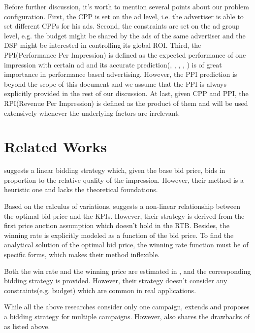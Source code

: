 \documentclass{article}
\begin{document}
Before further discussion, it's worth to mention several points about our problem configuration.
First, the CPP is set on the ad level, i.e. the advertiser is able to set different CPPs for his ads.
Second, the constraints are set on the ad group level,
    e.g. the budget might be shared by the ads of the same advertiser
    and the DSP might be interested in controlling its global ROI.
Third, the PPI(Performance Per Impression) is defined as the expected performance of one impression with certain ad
    and its accurate prediction(\cite{Google2013}, \cite{Facebook2014}, \cite{FFM2016}, \cite{CVR}, \cite{DelayedFeedback})
    is of great importance in performance based advertising.
However, the PPI prediction is beyond the scope of this document
    and we assume that the PPI is always explicitly provided in the rest of our discussion.
At last, given CPP and PPI, the RPI(Revenue Per Impression) is defined as the product of them
    and will be used extensively whenever the underlying factors are irrelevant.

\section{Related Works}

\cite{M6D} suggests a linear bidding strategy which, given the base bid price,
    bids in proportion to the relative quality of the impression.
However, their method is a heuristic one and lacks the theoretical foundations.

Based on the calculus of variations, \cite{WeinanZhang2014} suggests a non-linear relationship between the optimal bid price and the KPIs.
However, their strategy is derived from the first price auction assumption which doesn't hold in the RTB.
Besides, the winning rate is explicitly modeled as a function of the bid price.
To find the analytical solution of the optimal bid price,
    the winning rate function must be of specific forms,
    which makes their method inflexible.

Both the win rate and the winning price are estimated in \cite{XiangLi2014}, and the corresponding bidding strategy is provided.
However, their strategy doesn't consider any constraints(e.g. budget) which are common in real applications.

While all the above researches consider only one campaign,
    \cite{WeinanZhang2015} extends \cite{WeinanZhang2014} and proposes a bidding strategy for multiple campaigns.
However, \cite{WeinanZhang2015} also shares the drawbacks of \cite{WeinanZhang2014} as listed above.
\end{document}
